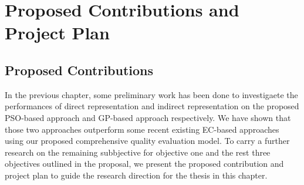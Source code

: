 \chapter{Proposed Contributions and Project Plan}\label{C:plan}

\section{Proposed Contributions}

In the previous chapter, some preliminary work has been done to investigaete the performances of direct representation and indirect representation on the proposed PSO-based approach and GP-based approach respectively. We have shown that those two approaches outperform some recent existing EC-based approaches using our proposed comprehensive quality evaluation model. To carry a further research on the remaining subbjective for objective one and the rest three objectives outlined in the proposal, we present the proposed contribution and project plan to guide the research direction for the thesis in this chapter.

